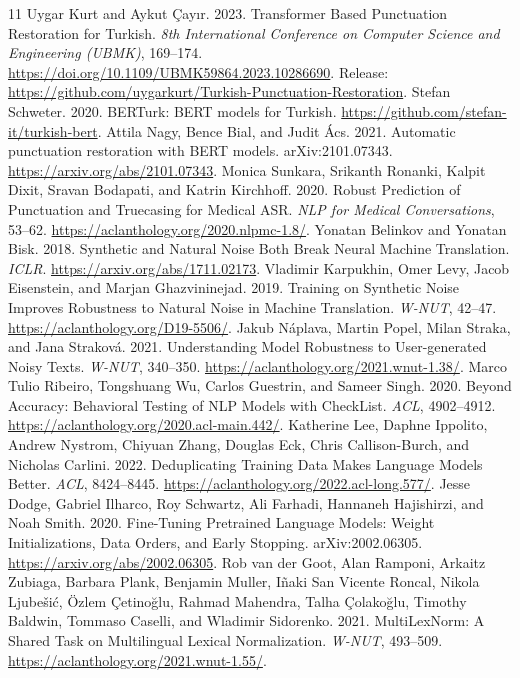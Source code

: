 \documentclass{article}
\begin{document}
\clearpage
\begin{thebibliography}{11}
 Uygar Kurt and Aykut \c{C}ay\i r. 2023.
Transformer Based Punctuation Restoration for Turkish.
\emph{8th International Conference on Computer Science and Engineering (UBMK)},
169--174. \url{https://doi.org/10.1109/UBMK59864.2023.10286690}.
Release: \url{https://github.com/uygarkurt/Turkish-Punctuation-Restoration}.
 Stefan Schweter. 2020. BERTurk: BERT models for Turkish.
\url{https://github.com/stefan-it/turkish-bert}.
 Attila Nagy, Bence Bial, and Judit \'{A}cs. 2021.
Automatic punctuation restoration with BERT models. arXiv:2101.07343.
\url{https://arxiv.org/abs/2101.07343}.
 Monica Sunkara, Srikanth Ronanki, Kalpit Dixit, Sravan
Bodapati, and Katrin Kirchhoff. 2020. Robust Prediction of Punctuation and
Truecasing for Medical ASR. \emph{NLP for Medical Conversations}, 53--62.
\url{https://aclanthology.org/2020.nlpmc-1.8/}.
 Yonatan Belinkov and Yonatan Bisk. 2018. Synthetic and
Natural Noise Both Break Neural Machine Translation. \emph{ICLR}.
\url{https://arxiv.org/abs/1711.02173}.
 Vladimir Karpukhin, Omer Levy, Jacob Eisenstein, and
Marjan Ghazvininejad. 2019. Training on Synthetic Noise Improves Robustness to
Natural Noise in Machine Translation. \emph{W-NUT}, 42--47.
\url{https://aclanthology.org/D19-5506/}.
 Jakub N\'{a}plava, Martin Popel, Milan Straka, and Jana
Strakov\'{a}. 2021. Understanding Model Robustness to User-generated Noisy Texts.
\emph{W-NUT}, 340--350. \url{https://aclanthology.org/2021.wnut-1.38/}.
 Marco Tulio Ribeiro, Tongshuang Wu, Carlos Guestrin, and
Sameer Singh. 2020. Beyond Accuracy: Behavioral Testing of NLP Models with
CheckList. \emph{ACL}, 4902--4912.
\url{https://aclanthology.org/2020.acl-main.442/}.
 Katherine Lee, Daphne Ippolito, Andrew Nystrom, Chiyuan Zhang,
Douglas Eck, Chris Callison-Burch, and Nicholas Carlini. 2022. Deduplicating
Training Data Makes Language Models Better. \emph{ACL}, 8424--8445.
\url{https://aclanthology.org/2022.acl-long.577/}.
 Jesse Dodge, Gabriel Ilharco, Roy Schwartz, Ali Farhadi,
Hannaneh Hajishirzi, and Noah Smith. 2020. Fine-Tuning Pretrained Language
Models: Weight Initializations, Data Orders, and Early Stopping.
arXiv:2002.06305. \url{https://arxiv.org/abs/2002.06305}.
 Rob van der Goot, Alan Ramponi, Arkaitz Zubiaga,
Barbara Plank, Benjamin Muller, I\~naki San Vicente Roncal, Nikola Ljube\v{s}i\'{c},
\"Ozlem \c{C}etino\u{g}lu, Rahmad Mahendra, Talha \c{C}olako\u{g}lu,
Timothy Baldwin, Tommaso Caselli, and Wladimir Sidorenko. 2021.
MultiLexNorm: A Shared Task on Multilingual Lexical Normalization.
\emph{W-NUT}, 493--509. \url{https://aclanthology.org/2021.wnut-1.55/}.
\end{thebibliography}
\end{document}
